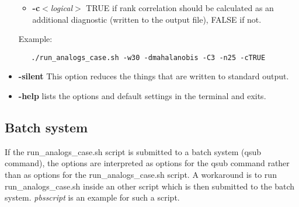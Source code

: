 \documentclass[11p,a4paper]{article}
\begin{document}
\begin{itemize}
\begin{itemize}
  \item \textbf{-c}\textit{$<$logical$>$} TRUE if rank correlation should be calculated as an additional diagnostic (written to the output file), FALSE if not.
 \end{itemize}  
  Example:
  \begin{verbatim}
   ./run_analogs_case.sh -w30 -dmahalanobis -C3 -n25 -cTRUE
  \end{verbatim}
 \item \textbf{-silent} This option reduces the things that are written to standard output.
 \item \textbf{-help} lists the options and default settings in the terminal and exits.
 
\end{itemize} 

\subsection{Batch system}
\label{sec:batchmode}
If the run\_analogs\_case.sh script is submitted to a batch system (qsub command), the options are interpreted as options for the qsub command rather than as options for the run\_analogs\_case.sh script. A workaround is to run run\_analogs\_case.sh inside an other script which is then submitted to the batch system. \textit{pbsscript} is an example for such a script.
\end{document}
